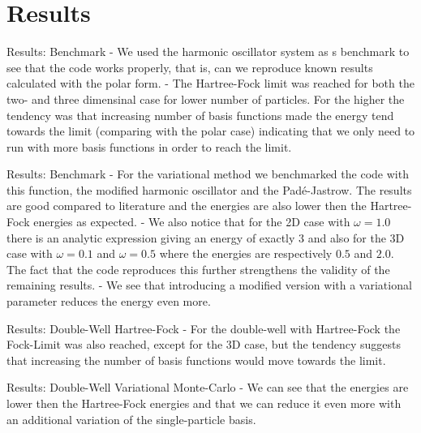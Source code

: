 \documentclass[10pt]{beamer}
\begin{document}
\section{Results}

\begin{frame}[fragile]{Results: Benchmark}
    - We used the harmonic oscillator system as s benchmark to see that the
    code works properly, that is, can we reproduce known results calculated
    with the polar form.
    - The Hartree-Fock limit was reached for both the two- and three dimensinal
    case for lower number of particles. For the higher the tendency was that
    increasing number of basis functions made the energy tend towards the limit
    (comparing with the polar case) indicating that we only need to run with
    more basis functions in order to reach the limit.
\end{frame}

\begin{frame}[fragile]{Results: Benchmark}
    - For the variational method we benchmarked the code with this function,
    the modified harmonic oscillator and the Pad\'e-Jastrow. The results are
    good compared to literature and the energies are also lower then the
    Hartree-Fock energies as expected.
    - We also notice that for the 2D case with $\omega=1.0$ there is an
    analytic expression giving an energy of exactly $3$ and also for the 3D
    case with $\omega=0.1$ and $\omega=0.5$ where the energies are respectively
    $0.5$ and $2.0$. The fact that the code reproduces this further strengthens
    the validity of the remaining results.
    - We see that introducing a modified version with a variational parameter
    reduces the energy even more.
\end{frame}

\begin{frame}[fragile]{Results: Double-Well Hartree-Fock}
    - For the double-well with Hartree-Fock the Fock-Limit was also reached,
    except for the 3D case, but the tendency suggests that increasing the
    number of basis functions would move towards the limit.
\end{frame}

\begin{frame}[fragile]{Results: Double-Well Variational Monte-Carlo}
    - We can see that the energies are lower then the Hartree-Fock energies and
    that we can reduce it even more with an additional variation of the
    single-particle basis.
\end{frame}
\end{document}
